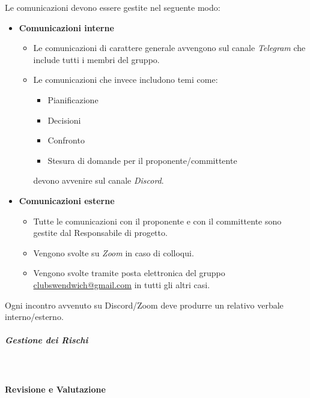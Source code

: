 Le comunicazioni devono essere gestite nel seguente modo:
\begin{itemize}
    \item \textbf{Comunicazioni interne}
    \begin{itemize}
        \item Le comunicazioni di carattere generale avvengono sul canale \textit{Telegram}
        che include tutti i membri del gruppo.
        \item Le comunicazioni che invece includono temi come: 
        \begin{itemize}
            \item Pianificazione
            \item Decisioni
            \item Confronto
            \item Stesura di domande per il proponente/committente
        \end{itemize}
        devono avvenire sul canale \textit{Discord}.
    \end{itemize}
    \item \textbf{Comunicazioni esterne}
    \begin{itemize}
        \item Tutte le comunicazioni con il proponente e con il committente sono gestite dal Responsabile di progetto.
        \item Vengono svolte su \textit{Zoom} in caso di colloqui.
        \item Vengono svolte tramite posta elettronica del gruppo \href{mailto:clubswendwich@gmail.com}{clubswendwich@gmail.com} in tutti gli altri casi.
    \end{itemize}
\end{itemize}

Ogni incontro avvenuto su Discord/Zoom deve produrre un relativo verbale interno/esterno.

\subparagraph{Gestione dei Rischi}
\mbox{}\\

\paragraph{Revisione e Valutazione}
\mbox{}\\

